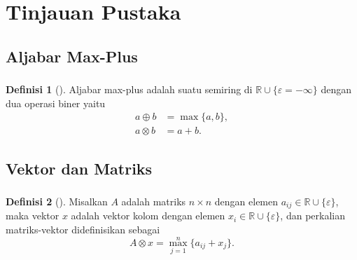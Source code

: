 \documentclass[aspectratio=169]{beamer}
\theoremstyle{definition}
\newtheorem{definisi}{Definisi}
\numberwithin{definisi}{subsection}
\newcommand{\R}{\mathbb{R}}
\begin{document}
    \section{Tinjauan Pustaka}
    \subsection{Aljabar Max-Plus}
    \begin{frame}
        \frametitle{\insertsubsection}
        \begin{definisi}[\cite{subiono2015minmaxplus}]
            Aljabar max-plus adalah suatu semiring di $\R \cup \{\varepsilon=-\infty\}$ dengan dua operasi biner yaitu
            \begin{align*}
                a \oplus b &= \max\{a,b\},\\
                a \otimes b &= a + b.
            \end{align*}
        \end{definisi}
    \end{frame}

    \subsection{Vektor dan Matriks}
    \begin{frame}
        \frametitle{\insertsubsection}
        \begin{definisi}[\cite{butkovic2010maxplus}]
            Misalkan $A$ adalah matriks $n \times n$ dengan elemen $a_{ij} \in \R \cup \{\varepsilon\}$, maka vektor $x$ adalah vektor kolom dengan elemen $x_i \in \R \cup \{\varepsilon\}$, dan perkalian matriks-vektor didefinisikan sebagai
            \[
                A\otimes x = \max_{j=1}^{n} \{a_{ij} + x_j\}.
            \]
        \end{definisi}
    \end{frame}
\end{document}
